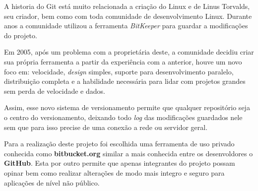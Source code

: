 A historia do Git está muito relacionada a criação do Linux e de Linus Torvalds, seu criador, bem como com toda comunidade de desenvolvimento Linux. Durante anos a comunidade utilizou a ferramenta \textit{BitKeeper} para guardar a modificações do projeto.

Em 2005, após um problema com a proprietária deste, a comunidade decidiu criar sua própria ferramenta a partir da experiência com a anterior, houve um novo foco em: velocidade, \textit{design} simples, suporte para desenvolvimento paralelo, distribuição completa e a habilidade necessária para lidar com projetos grandes sem perda de velocidade e dados.

Assim, esse novo sistema de versionamento permite que qualquer repositório seja o centro do versionamento, deixando todo \textit{log} das modificações guardados nele sem que para isso precise de uma conexão a rede ou servidor geral.

Para a realização deste projeto foi escolhida uma ferramenta de uso privado conhecida como \textbf{ bitbucket.org } similar a mais conhecida entre os desenvoldores o \textbf{GitHub}. Esta por outro permite que apenas integrantes do projeto possam opinar
bem como realizar alterações de modo mais integro e seguro para aplicações de nível não público.